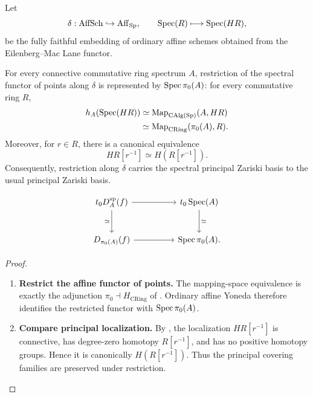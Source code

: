 Let
\[
    \delta
    :
    \operatorname{AffSch}
    \hookrightarrow
    \operatorname{Aff}_{\operatorname{Sp}},
    \qquad
    \operatorname{Spec}(R)\longmapsto\operatorname{Spec}(HR),
\]
be the fully faithful embedding of ordinary affine schemes obtained from the
Eilenberg--Mac Lane functor.

\begin{proposition}
\label{prop:zero-truncated-affine-reconstruction}
For every connective commutative ring spectrum \(A\), restriction of the
spectral functor of points along \(\delta\) is represented by
\(\operatorname{Spec}\pi_0(A)\): for every commutative ring \(R\),
\[
\begin{aligned}
    h_A(\operatorname{Spec}(HR))
    &\simeq
    \operatorname{Map}_{\operatorname{CAlg}(\operatorname{Sp})}(A,HR)
    \\
    &\simeq
    \operatorname{Map}_{\operatorname{CRing}}(\pi_0(A),R).
\end{aligned}
\]
Moreover, for \(r\in R\), there is a canonical equivalence
\[
    HR[r^{-1}]
    \simeq
    H(R[r^{-1}]).
\]
Consequently, restriction along \(\delta\) carries the spectral principal
Zariski basis to the usual principal Zariski basis.
\end{proposition}

\[
\begin{tikzcd}[column sep=huge, row sep=large]
    t_0D_A^{\mathrm{sp}}(f)
        \arrow[r]
        \arrow[d, "\simeq"']
    &
    t_0\Spec(A)
        \arrow[d, "\simeq"]
    \\
    D_{\pi_0(A)}(f)
        \arrow[r]
    &
    \Spec\pi_0(A).
\end{tikzcd}
\]


\begin{proof}
\leavevmode
\begin{enumerate}[label=\textup{(\arabic*)}]
    \item \textbf{Restrict the affine functor of points.}
    The mapping-space equivalence is exactly the adjunction
    \(\pi_0\dashv H_{\mathrm{CRing}}\) of
    . Ordinary affine Yoneda therefore
    identifies the restricted functor with \(\operatorname{Spec}\pi_0(A)\).

    \item \textbf{Compare principal localization.}
    By , the localization
    \(HR[r^{-1}]\) is connective, has degree-zero homotopy
    \(R[r^{-1}]\), and has no positive homotopy groups. Hence it is
    canonically \(H(R[r^{-1}])\). Thus the principal covering families are
    preserved under restriction.
\end{enumerate}
\end{proof}

